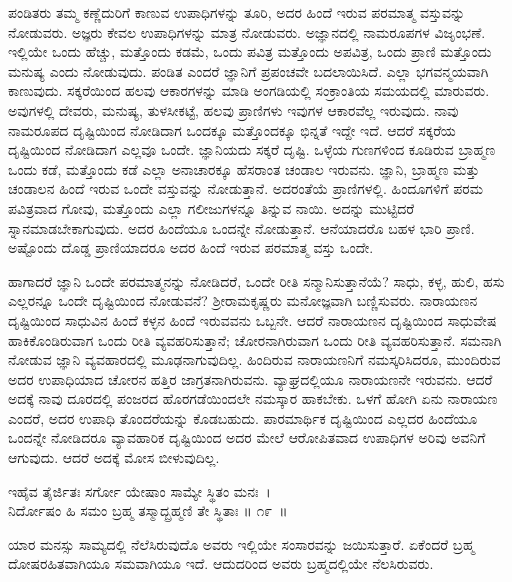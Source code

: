 ಪಂಡಿತರು ತಮ್ಮ ಕಣ್ಣೆದುರಿಗೆ ಕಾಣುವ ಉಪಾಧಿಗಳನ್ನು ತೂರಿ, ಅದರ ಹಿಂದೆ ಇರುವ ಪರಮಾತ್ಮ ವಸ್ತುವನ್ನು ನೋಡುವರು. ಅಜ್ಞರು ಕೇವಲ ಉಪಾಧಿಗಳನ್ನು ಮಾತ್ರ ನೋಡುವರು. ಅಜ್ಞಾನದಲ್ಲಿ ನಾಮರೂಪಗಳ ವಿಜೃಂಭಣೆ. ಇಲ್ಲಿಯೇ ಒಂದು ಹೆಚ್ಚು, ಮತ್ತೊಂದು ಕಡಮೆ, ಒಂದು ಪವಿತ್ರ ಮತ್ತೊಂದು ಅಪವಿತ್ರ, ಒಂದು ಪ್ರಾಣಿ ಮತ್ತೊಂದು ಮನುಷ್ಯ ಎಂದು ನೋಡುವುದು. ಪಂಡಿತ ಎಂದರೆ ಜ್ಞಾನಿಗೆ ಪ್ರಪಂಚವೇ ಬದಲಾಯಿಸಿದೆ. ಎಲ್ಲಾ ಭಗವನ್ಮಯವಾಗಿ ಕಾಣುವುದು. ಸಕ್ಕರೆಯಿಂದ ಹಲವು ಆಕಾರಗಳನ್ನು ಮಾಡಿ ಅಂಗಡಿಯಲ್ಲಿ ಸಂಕ್ರಾಂತಿಯ ಸಮಯದಲ್ಲಿ ಮಾರುವರು. ಅವುಗಳಲ್ಲಿ ದೇವರು, ಮನುಷ್ಯ, ತುಳಸೀಕಟ್ಟೆ, ಹಲವು ಪ್ರಾಣಿಗಳು ಇವುಗಳ ಆಕಾರವೆಲ್ಲ ಇರುವುದು. ನಾವು ನಾಮರೂಪದ ದೃಷ್ಟಿಯಿಂದ ನೋಡಿದಾಗ ಒಂದಕ್ಕೂ ಮತ್ತೊಂದಕ್ಕೂ ಭಿನ್ನತೆ ಇದ್ದೇ ಇದೆ. ಆದರೆ ಸಕ್ಕರೆಯ ದೃಷ್ಟಿಯಿಂದ ನೋಡಿದಾಗ ಎಲ್ಲವೂ ಒಂದೇ. ಜ್ಞಾನಿಯದು ಸಕ್ಕರೆ ದೃಷ್ಟಿ. ಒಳ್ಳೆಯ ಗುಣಗಳಿಂದ ಕೂಡಿರುವ ಬ್ರಾಹ್ಮಣ ಒಂದು ಕಡೆ, ಮತ್ತೊಂದು ಕಡೆ ಎಲ್ಲಾ ಅನಾಚಾರಕ್ಕೂ ಹೆಸರಾಂತ ಚಂಡಾಲ ಇರುವನು. ಜ್ಞಾನಿ, ಬ್ರಾಹ್ಮಣ ಮತ್ತು ಚಂಡಾಲನ ಹಿಂದೆ ಇರುವ ಒಂದೇ ವಸ್ತುವನ್ನು ನೋಡುತ್ತಾನೆ. ಅದರಂತೆಯೆ ಪ್ರಾಣಿಗಳಲ್ಲಿ. ಹಿಂದೂಗಳಿಗೆ ಪರಮ ಪವಿತ್ರವಾದ ಗೋವು, ಮತ್ತೊಂದು ಎಲ್ಲಾ ಗಲೀಜುಗಳನ್ನೂ ತಿನ್ನುವ ನಾಯಿ. ಅದನ್ನು ಮುಟ್ಟಿದರೆ ಸ್ನಾನಮಾಡಬೇಕಾಗುವುದು. ಅದರ ಹಿಂದೆಯೂ ಒಂದನ್ನೇ ನೋಡುತ್ತಾನೆ. ಆನೆಯಾದರೊ ಬಹಳ ಭಾರಿ ಪ್ರಾಣಿ. ಅಷ್ಟೊಂದು ದೊಡ್ಡ ಪ್ರಾಣಿಯಾದರೂ ಅದರ ಹಿಂದೆ ಇರುವ ಪರಮಾತ್ಮ ವಸ್ತು ಒಂದೇ.

ಹಾಗಾದರೆ ಜ್ಞಾನಿ ಒಂದೇ ಪರಮಾತ್ಮನನ್ನು ನೋಡಿದರೆ, ಒಂದೇ ರೀತಿ ಸನ್ಮಾನಿಸುತ್ತಾನೆಯೆ? ಸಾಧು, ಕಳ್ಳ, ಹುಲಿ, ಹಸು ಎಲ್ಲರನ್ನೂ ಒಂದೇ ದೃಷ್ಟಿಯಿಂದ ನೋಡುವನೆ? ಶ‍್ರೀರಾಮಕೃಷ್ಣರು ಮನೋಜ್ಞವಾಗಿ ಬಣ್ಣಿಸುವರು. ನಾರಾಯಣನ ದೃಷ್ಟಿಯಿಂದ ಸಾಧುವಿನ ಹಿಂದೆ ಕಳ್ಳನ ಹಿಂದೆ ಇರುವವನು ಒಬ್ಬನೇ. ಆದರೆ ನಾರಾಯಣನ ದೃಷ್ಟಿಯಿಂದ ಸಾಧುವೇಷ ಹಾಕಿಕೊಂಡಿರುವಾಗ ಒಂದು ರೀತಿ ವ್ಯವಹರಿಸುತ್ತಾನೆ; ಚೋರನಾಗಿರುವಾಗ ಒಂದು ರೀತಿ ವ್ಯವಹರಿಸುತ್ತಾನೆ. ಸಮನಾಗಿ ನೋಡುವ ಜ್ಞಾನಿ ವ್ಯವಹಾರದಲ್ಲಿ ಮೂಢನಾಗುವುದಿಲ್ಲ. ಹಿಂದಿರುವ ನಾರಾಯಣನಿಗೆ ನಮಸ್ಕರಿಸಿದರೂ, ಮುಂದಿರುವ ಅದರ ಉಪಾಧಿಯಾದ ಚೋರನ ಹತ್ತಿರ ಜಾಗ್ರತನಾಗಿರುವನು. ವ್ಯಾಘ್ರದಲ್ಲಿಯೂ ನಾರಾಯಣನೇ ಇರುವನು. ಆದರೆ ಅದಕ್ಕೆ ನಾವು ದೂರದಲ್ಲಿ ಪಂಜರದ ಹೊರಗಡೆಯಿಂದಲೇ ನಮಸ್ಕಾರ ಹಾಕಬೇಕು. ಒಳಗೆ ಹೋಗಿ ಏನು ನಾರಾಯಣ ಎಂದರೆ, ಅದರ ಉಪಾಧಿ ತೊಂದರೆಯನ್ನು ಕೊಡಬಹುದು. ಪಾರಮಾರ್ಥಿಕ ದೃಷ್ಟಿಯಿಂದ ಎಲ್ಲದರ ಹಿಂದೆಯೂ ಒಂದನ್ನೇ ನೋಡಿದರೂ ವ್ಯಾವಹಾರಿಕ ದೃಷ್ಟಿಯಿಂದ ಅದರ ಮೇಲೆ ಆರೋಪಿತವಾದ ಉಪಾಧಿಗಳ ಅರಿವು ಅವನಿಗೆ ಆಗುವುದು. ಆದರೆ ಅದಕ್ಕೆ ಮೋಸ ಬೀಳುವುದಿಲ್ಲ.

\begin{shloka}
ಇಹೈವ ತೈರ್ಜಿತಃ ಸರ್ಗೋ ಯೇಷಾಂ ಸಾಮ್ಯೇ ಸ್ಥಿತಂ ಮನಃ~।\\ನಿರ್ದೋಷಂ ಹಿ ಸಮಂ ಬ್ರಹ್ಮ ತಸ್ಮಾದ್ಬ್ರಹ್ಮಣಿ ತೇ ಸ್ಥಿತಾಃ \hfill॥ ೧೯~॥
\end{shloka}

\begin{artha}
ಯಾರ ಮನಸ್ಸು ಸಾಮ್ಯದಲ್ಲಿ ನೆಲೆಸಿರುವುದೊ ಅವರು ಇಲ್ಲಿಯೇ ಸಂಸಾರವನ್ನು ಜಯಿಸುತ್ತಾರೆ. ಏಕೆಂದರೆ ಬ್ರಹ್ಮ ದೋಷರಹಿತವಾಗಿಯೂ ಸಮವಾಗಿಯೂ ಇದೆ. ಆದುದರಿಂದ ಅವರು ಬ್ರಹ್ಮದಲ್ಲಿಯೇ ನೆಲಸಿರುವರು.
\end{artha}

